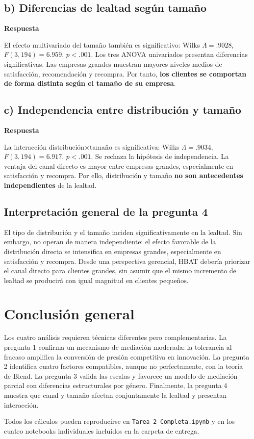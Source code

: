 \documentclass[11pt,letterpaper]{article}
\begin{document}
\subsection{b) Diferencias de lealtad según tamaño}

\textbf{Respuesta}

El efecto multivariado del tamaño también es significativo: Wilks $\Lambda=.9028$, $F(3,194)=6.959$, $p<.001$. Los tres ANOVA univariados presentan diferencias significativas. Las empresas grandes muestran mayores niveles medios de satisfacción, recomendación y recompra. Por tanto, \textbf{los clientes se comportan de forma distinta según el tamaño de su empresa}.

\subsection{c) Independencia entre distribución y tamaño}

\textbf{Respuesta}

La interacción distribución$\times$tamaño es significativa: Wilks $\Lambda=.9034$, $F(3,194)=6.917$, $p<.001$. Se rechaza la hipótesis de independencia. La ventaja del canal directo es mayor entre empresas grandes, especialmente en satisfacción y recompra. Por ello, distribución y tamaño \textbf{no son antecedentes independientes} de la lealtad.

\subsection{Interpretación general de la pregunta 4}

El tipo de distribución y el tamaño inciden significativamente en la lealtad. Sin embargo, no operan de manera independiente: el efecto favorable de la distribución directa se intensifica en empresas grandes, especialmente en satisfacción y recompra. Desde una perspectiva gerencial, HBAT debería priorizar el canal directo para clientes grandes, sin asumir que el mismo incremento de lealtad se producirá con igual magnitud en clientes pequeños.

\section{Conclusión general}

Los cuatro análisis requieren técnicas diferentes pero complementarias. La pregunta 1 confirma un mecanismo de mediación moderada: la tolerancia al fracaso amplifica la conversión de presión competitiva en innovación. La pregunta 2 identifica cuatro factores compatibles, aunque no perfectamente, con la teoría de Blend. La pregunta 3 valida las escalas y favorece un modelo de mediación parcial con diferencias estructurales por género. Finalmente, la pregunta 4 muestra que canal y tamaño afectan conjuntamente la lealtad y presentan interacción.

Todos los cálculos pueden reproducirse en \texttt{Tarea\_2\_Completa.ipynb} y en los cuatro notebooks individuales incluidos en la carpeta de entrega.
\end{document}
